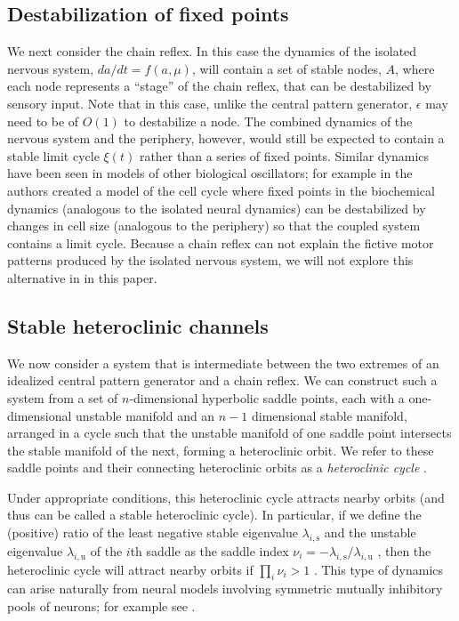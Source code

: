 \subsection{Destabilization of fixed points}
\label{sec:chain_reflex}

We next consider the chain reflex.  In this case the dynamics of the isolated
nervous system, $da/dt = f(a, \mu)$, will contain a set of stable nodes, $A$,
where each node represents a ``stage'' of the chain reflex, that can be
destabilized by sensory input.  Note that in this case, unlike the central
pattern generator, $\epsilon$ may need to be of $O(1)$ to destabilize a node.
The combined dynamics of the nervous system and the periphery, however, would
still be expected to contain a stable limit cycle $\xi(t)$ rather than a series
of fixed points.  Similar dynamics have been seen in models of other biological
oscillators; for example in \citet{novak_model_1998} the authors created a
model of the cell cycle where fixed points in the biochemical dynamics
(analogous to the isolated neural dynamics) can be destabilized by changes in
cell size (analogous to the periphery) so that the coupled system contains a
limit cycle.  Because a chain reflex can not explain the fictive motor patterns
produced by the isolated nervous system, we will not explore this alternative in
in this paper.

\subsection{Stable heteroclinic channels}
We now consider a system that is intermediate between the two extremes of an
idealized central pattern generator and a chain reflex.  We can construct
such a system from a set of $n$-dimensional hyperbolic saddle points, each with a
one-dimensional unstable manifold and an $n-1$ dimensional stable manifold,
arranged in a cycle such that the unstable manifold of one saddle point
intersects the stable manifold of the next, forming a heteroclinic orbit.  We
refer to these saddle points and their connecting heteroclinic orbits as a
\emph{heteroclinic cycle} \citep{guckenheimer_structurally_1988}.

Under appropriate conditions, this heteroclinic cycle attracts nearby orbits
(and thus can be called a stable heteroclinic cycle).  In particular, if we
define the (positive) ratio of the least negative stable eigenvalue
$\lambda_{i,\textrm{s}}$ and the unstable eigenvalue $\lambda_{i,\textrm{u}}$
of the $i$th saddle as the saddle index $\nu_i = -\lambda_{i,\textrm{s}} /
\lambda_{i,\textrm{u}}$ \citep{shilnikov_methods_2002}, then the heteroclinic
cycle will attract nearby orbits if $\prod_i \nu_i > 1$
\citep{afraimovich_heteroclinic_2003}.  This type of dynamics can arise
naturally from neural models involving symmetric mutually inhibitory pools of
neurons; for example see \citet{nowotny_dynamical_2007}.

